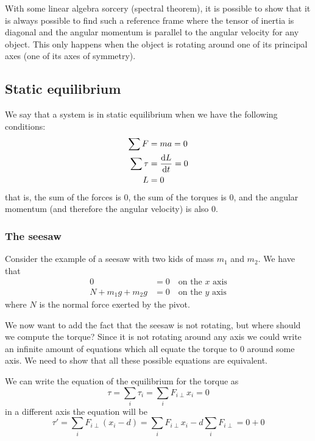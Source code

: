 \documentclass[12pt]{extarticle}
\begin{document}
With some linear algebra sorcery (spectral theorem), it is possible to show that it is always possible to find such a reference frame where the tensor of inertia is diagonal and the angular momentum is parallel to the angular velocity for any object.
This only happens when the object is rotating around one of its principal axes (one of its axes of symmetry).


\subsection{Static equilibrium}

We say that a system is in static equilibrium when we have the following conditions:
\begin{align}
    \sum F    & = ma = 0        \\
    \sum \tau & = \dv{L}{t} = 0 \\
    L         & = 0
\end{align}
that is, the sum of the forces is $0$, the sum of the torques is $0$, and the angular momentum (and therefore the angular velocity) is also $0$.

\subsubsection{The seesaw}

Consider the example of a seesaw with two kids of mass $m_1$ and $m_2$.
We have that
\begin{align}
    0                 & = 0 \quad \text{on the $x$ axis} \\
    N + m_1 g + m_2 g & = 0 \quad \text{on the $y$ axis}
\end{align}
where $N$ is the normal force exerted by the pivot.

We now want to add the fact that the seesaw is not rotating, but where should we compute the torque?
Since it is not rotating around any axis we could write an infinite amount of equations which all equate the torque to $0$ around some axis.
We need to show that all these possible equations are equivalent.

We can write the equation of the equilibrium for the torque as
\begin{equation}
    \tau = \sum_i \tau_i = \sum_i F_{i \perp} x_i = 0
\end{equation}
in a different axis the equation will be
\begin{equation}
    \tau' = \sum_i F_{i \perp} (x_i - d) = \sum_i F_{i \perp} x_i - d \sum_i F_{i \perp} = 0 + 0
\end{equation}
\end{document}
